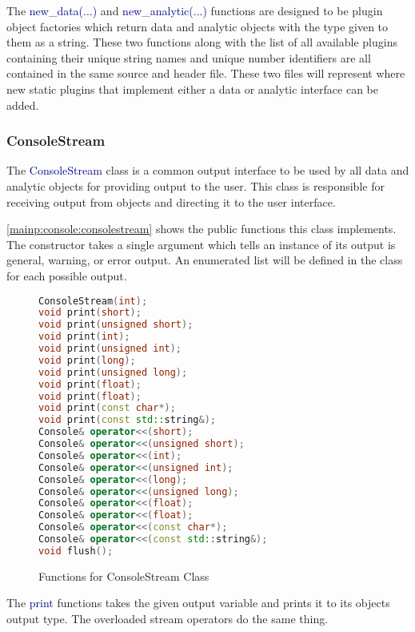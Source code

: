 \documentclass[10pt]{article}
\providecommand{\h}[1]{\textcolor{darkblue}{#1}}
\begin{document}
The \h{new\_data(...)} and \h{new\_analytic(...)} functions are designed to be 
plugin object factories which return data and analytic objects with the type 
given to them as a string. These two functions along with the list of all 
available plugins containing their unique string names and unique number 
identifiers are all contained in the same source and header file. These two 
files will represent where new static plugins that implement either a data or 
analytic interface can be added.

\subsubsection{ConsoleStream}

The \h{ConsoleStream} class is a common output interface to be used by all data 
and analytic objects for providing output to the user. This class is 
responsible for receiving output from objects and directing it to the user 
interface.

\autoref{mainp:console:consolestream} shows the public functions this class 
implements. The constructor takes a single argument which tells an instance of 
its output is general, warning, or error output. An enumerated list will be 
defined in the class for each possible output.

\begin{figure}[H]
\begin{mdframed}[style=functions]
\begin{lstlisting}[language=C++]
ConsoleStream(int);
void print(short);
void print(unsigned short);
void print(int);
void print(unsigned int);
void print(long);
void print(unsigned long);
void print(float);
void print(float);
void print(const char*);
void print(const std::string&);
Console& operator<<(short);
Console& operator<<(unsigned short);
Console& operator<<(int);
Console& operator<<(unsigned int);
Console& operator<<(long);
Console& operator<<(unsigned long);
Console& operator<<(float);
Console& operator<<(float);
Console& operator<<(const char*);
Console& operator<<(const std::string&);
void flush();
\end{lstlisting}
\end{mdframed}
\caption{Functions for ConsoleStream Class}
\label{mainp:console:consolestream}
\end{figure}

The \h{print} functions takes the given output variable and prints it to its 
objects output type. The overloaded stream operators do the same thing.
\end{document}
